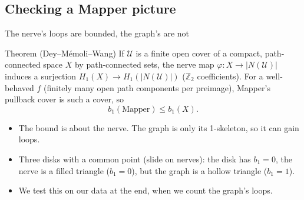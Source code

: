 \documentclass[aspectratio=169]{beamer}
\newcommand{\Z}{\mathbb{Z}}
\newcommand{\src}[1]{\par\vspace{2pt}\hfill{\scriptsize\textcolor{gray}{\parencite{#1}}}}
\begin{document}
\subsection{Checking a Mapper picture}
\begin{frame}{The nerve's loops are bounded, the graph's are not}
\begin{block}{Theorem (Dey--M\'emoli--Wang)}
If $\mathcal U$ is a finite open cover of a compact, path-connected space $X$ by path-connected sets, the nerve map $\varphi : X \to |N(\mathcal U)|$ induces a surjection $H_1(X) \to H_1(|N(\mathcal U)|)$ ($\Z_2$ coefficients).
For a well-behaved $f$ (finitely many open path components per preimage), Mapper's pullback cover is such a cover, so
\[ b_1(\text{Mapper}) \le b_1(X). \]
\src{deymemoliwang2017}
\end{block}
\begin{itemize}\small
  \item The bound is about the nerve. The graph is only its 1-skeleton, so it can gain loops.
  \item Three disks with a common point (slide on nerves): the disk has $b_1 = 0$, the nerve is a filled triangle ($b_1 = 0$), but the graph is a hollow triangle ($b_1 = 1$).
  \item We test this on our data at the end, when we count the graph's loops.
\end{itemize}
\end{frame}
\end{document}
